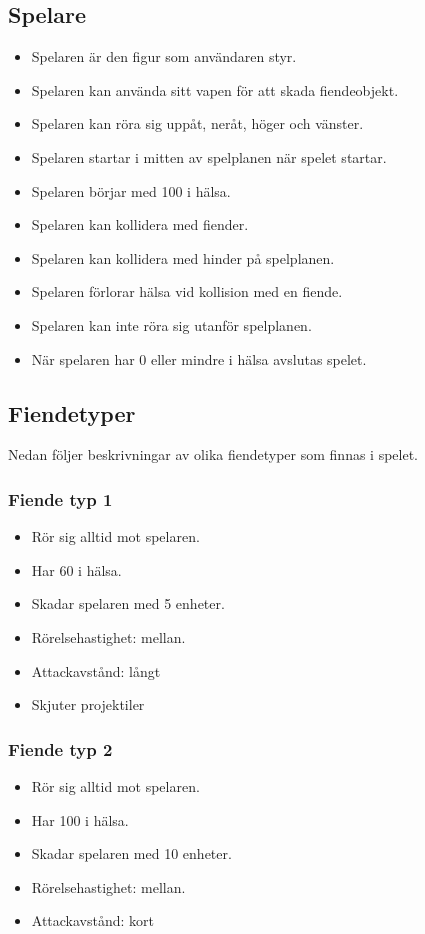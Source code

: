 \documentclass{TDP005mall}
\begin{document}
  \subsection{Spelare}
  \begin{itemize}
    \item Spelaren är den figur som användaren styr.
    \item Spelaren kan använda sitt vapen för att skada fiendeobjekt.
    \item Spelaren kan röra sig uppåt, neråt, höger och vänster.
    \item Spelaren startar i mitten av spelplanen när spelet startar.
    \item Spelaren börjar med 100 i hälsa.
    \item Spelaren kan kollidera med fiender.
    \item Spelaren kan kollidera med hinder på spelplanen.
    \item Spelaren förlorar hälsa vid kollision med en fiende.
    \item Spelaren kan inte röra sig utanför spelplanen.
    \item När spelaren har 0 eller mindre i hälsa avslutas spelet.
  \end{itemize}


  \subsection{Fiendetyper}
  Nedan följer beskrivningar av olika fiendetyper som finnas i spelet.
  \subsubsection{Fiende typ 1}
  \begin{itemize}
    \item Rör sig alltid mot spelaren.
    \item Har 60 i hälsa.
    \item Skadar spelaren med 5 enheter.
    \item Rörelsehastighet: mellan.
    \item Attackavstånd: långt
    \item Skjuter projektiler
  \end{itemize}

  \subsubsection{Fiende typ 2}
  \begin{itemize}
    \item Rör sig alltid mot spelaren.
    \item Har 100 i hälsa.
    \item Skadar spelaren med 10 enheter.
    \item Rörelsehastighet: mellan.
    \item Attackavstånd: kort
  \end{itemize}
\end{document}
